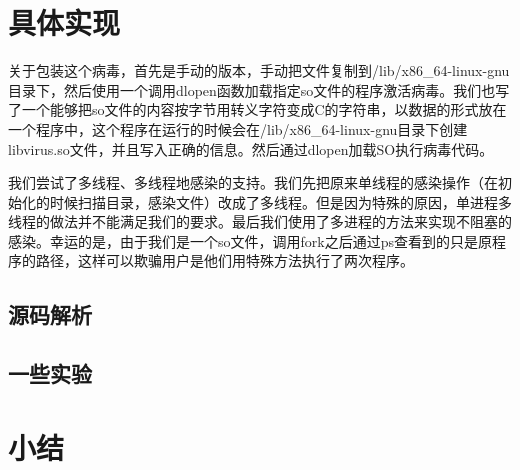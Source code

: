 \documentclass[a4paper, 11pt]{article}
\begin{document}
\section{具体实现}
关于包装这个病毒，首先是手动的版本，手动把文件复制到/lib/x86\_64-linux-gnu目录下，然后使用一个调用dlopen函数加载指定so文件的程序激活病毒。我们也写了一个能够把so文件的内容按字节用转义字符变成C的字符串，以数据的形式放在一个程序中，这个程序在运行的时候会在/lib/x86\_64-linux-gnu目录下创建libvirus.so文件，并且写入正确的信息。然后通过dlopen加载SO执行病毒代码。

我们尝试了多线程、多线程地感染的支持。我们先把原来单线程的感染操作（在初始化的时候扫描目录，感染文件）改成了多线程。但是因为特殊的原因，单进程多线程的做法并不能满足我们的要求。最后我们使用了多进程的方法来实现不阻塞的感染。幸运的是，由于我们是一个so文件，调用fork之后通过ps查看到的只是原程序的路径，这样可以欺骗用户是他们用特殊方法执行了两次程序。

\subsection{源码解析}

\subsection{一些实验}
\section{小结}
\end{document}
